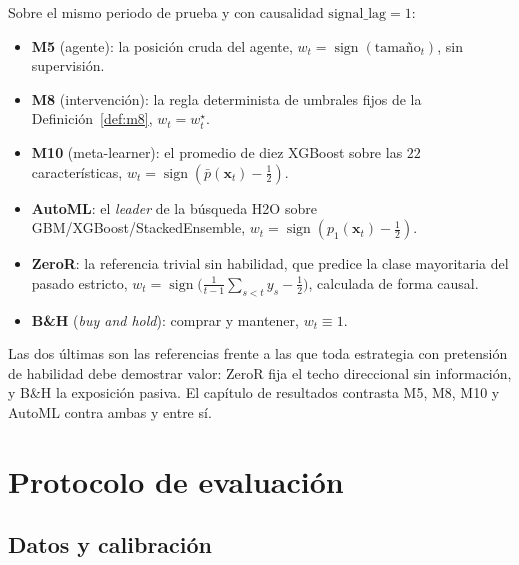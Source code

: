\begin{definicion}
\label{def:estrategias}
Sobre el mismo periodo de prueba y con causalidad $\mathrm{signal\_lag} = 1$:
\begin{itemize}
\item \textbf{M5} (agente): la posición cruda del agente, $w_t = \operatorname{sign}(\text{tamaño}_t)$, sin supervisión.
\item \textbf{M8} (intervención): la regla determinista de umbrales fijos de la Definición~\ref{def:m8}, $w_t = w_t^{\star}$.
\item \textbf{M10} (meta-learner): el promedio de diez XGBoost sobre las $22$ características, $w_t = \operatorname{sign}(\bar{p}(\mathbf{x}_t) - \tfrac{1}{2})$.
\item \textbf{AutoML}: el \emph{leader} de la búsqueda H2O sobre GBM/XGBoost/StackedEnsemble, $w_t = \operatorname{sign}(p_1(\mathbf{x}_t) - \tfrac{1}{2})$.
\item \textbf{ZeroR}: la referencia trivial sin habilidad, que predice la clase mayoritaria del pasado estricto, $w_t = \operatorname{sign}\!\big(\tfrac{1}{t-1}\sum_{s < t} y_s - \tfrac{1}{2}\big)$, calculada de forma causal.
\item \textbf{B\&H} (\emph{buy and hold}): comprar y mantener, $w_t \equiv 1$.
\end{itemize}
\end{definicion}

Las dos últimas son las referencias frente a las que toda estrategia con pretensión de habilidad debe demostrar valor: ZeroR fija el techo direccional sin información, y B\&H la exposición pasiva. El capítulo de resultados contrasta M5, M8, M10 y AutoML contra ambas y entre sí.

\section{Protocolo de evaluación}
\label{sec:strata-protocolo}

\subsection{Datos y calibración}
\label{sec:strata-calib}

